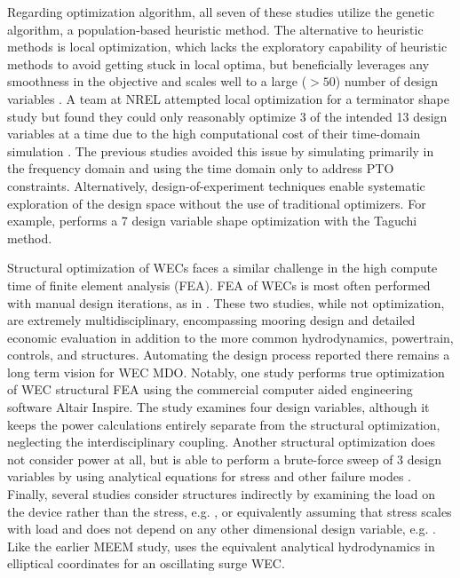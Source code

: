 Regarding optimization algorithm, all seven of these studies \cite{khanal_multi-objective_2024,gaudin_single_2021,edwards_optimisation_2022,garcia-teruel_reliability-based_2021,garcia-teruel_design_2022,cotten_multi-objective_2022,abdulkadir_control_2024} utilize the genetic algorithm, a population-based heuristic method. The alternative to heuristic methods is local optimization, which lacks the exploratory capability of heuristic methods to avoid getting stuck in local optima, but beneficially leverages any smoothness in the objective and scales well to a large ($>50$) number of design variables \cite{martins_engineering_2022}. A team at NREL attempted local optimization for a terminator shape study but found they could only reasonably optimize 3 of the intended 13 design variables at a time due to the high computational cost of their time-domain simulation \cite{housner_numerical_2024}. The previous studies \cite{garcia-teruel_reliability-based_2021,garcia-teruel_design_2022,cotten_multi-objective_2022} avoided this issue by simulating primarily in the frequency domain and using the time domain only to address PTO constraints. Alternatively, design-of-experiment techniques enable systematic exploration of the design space without the use of traditional optimizers. For example, \cite{al_shami_parameter_2019} performs a 7 design variable shape optimization with the Taguchi method.

Structural optimization of WECs faces a similar challenge in the high compute time of finite element analysis (FEA). FEA of WECs is most often performed with manual design iterations, as in \cite{RM3,mi_multi-scale_2025}. These two studies, while not optimization, are extremely multidisciplinary, encompassing mooring design and detailed economic evaluation in addition to the more common hydrodynamics, powertrain, controls, and structures. Automating the design process reported there remains a long term vision for WEC MDO. Notably, one study \cite{an_optimal_2024} performs true optimization of WEC structural FEA using the commercial computer aided engineering software Altair Inspire. The study examines four design variables, although it keeps the power calculations entirely separate from the structural optimization, neglecting the interdisciplinary coupling. Another structural optimization does not consider power at all, but is able to perform a brute-force sweep of 3 design variables by using analytical equations for stress and other failure modes \cite{ambuhl_reliability-based_2014}. Finally, several studies consider structures indirectly by examining the load on the device rather than the stress, e.g. \cite{nguyen_theoretical_2024, ferri_balancing_2014}, or equivalently assuming that stress scales with load and does not depend on any other dimensional design variable, e.g. \cite{garcia-teruel_reliability-based_2021, cotten_multi-objective_2022}. Like the earlier MEEM study, \cite{nguyen_theoretical_2024} uses the equivalent analytical hydrodynamics in elliptical coordinates for an oscillating surge WEC.

